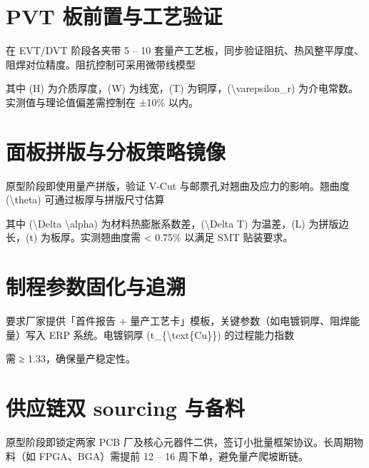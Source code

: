 \chapter{PVT 板前置与工艺验证}
在 EVT/DVT 阶段各夹带 5 – 10 套量产工艺板，同步验证阻抗、热风整平厚度、阻焊对位精度。阻抗控制可采用微带线模型\par
[
Z\_{}0 = \textbackslash{}frac\{{}87\}{}\{{}\textbackslash{}sqrt\{{}\textbackslash{}varepsilon\_{}r + 1.41\}{}\}{} \textbackslash{}ln \textbackslash{}left( \textbackslash{}frac\{{}5.98H\}{}\{{}0.8W + T\}{} \textbackslash{}right)
]\par
其中 (H) 为介质厚度，(W) 为线宽，(T) 为铜厚，(\textbackslash{}varepsilon\_{}r) 为介电常数。实测值与理论值偏差需控制在 ±10\%{} 以内。\par
\chapter{面板拼版与分板策略镜像}
原型阶段即使用量产拼版，验证 V-Cut 与邮票孔对翘曲及应力的影响。翘曲度 (\textbackslash{}theta) 可通过板厚与拼版尺寸估算\par
[
\textbackslash{}theta \textbackslash{}approx \textbackslash{}frac\{{}\textbackslash{}Delta \textbackslash{}alpha \textbackslash{}cdot \textbackslash{}Delta T \textbackslash{}cdot L\^{}2\}{}\{{}2t\}{}
]\par
其中 (\textbackslash{}Delta \textbackslash{}alpha) 为材料热膨胀系数差，(\textbackslash{}Delta T) 为温差，(L) 为拼版边长，(t) 为板厚。实测翘曲度需 < 0.75\%{} 以满足 SMT 贴装要求。\par
\chapter{制程参数固化与追溯}
要求厂家提供「首件报告 + 量产工艺卡」模板，关键参数（如电镀铜厚、阻焊能量）写入 ERP 系统。电镀铜厚 (t\_{}\{{}\textbackslash{}text\{{}Cu\}{}\}{}) 的过程能力指数\par
[
C\_{}\{{}\textbackslash{}text\{{}pk\}{}\}{} = \textbackslash{}min \textbackslash{}left( \textbackslash{}frac\{{}\textbackslash{}text\{{}USL\}{} - \textbackslash{}mu\}{}\{{}3\textbackslash{}sigma\}{}, \textbackslash{}frac\{{}\textbackslash{}mu - \textbackslash{}text\{{}LSL\}{}\}{}\{{}3\textbackslash{}sigma\}{} \textbackslash{}right)
]\par
需 ≥ 1.33，确保量产稳定性。\par
\chapter{供应链双 sourcing 与备料}
原型阶段即锁定两家 PCB 厂及核心元器件二供，签订小批量框架协议。长周期物料（如 FPGA、BGA）需提前 12 – 16 周下单，避免量产爬坡断链。\par
